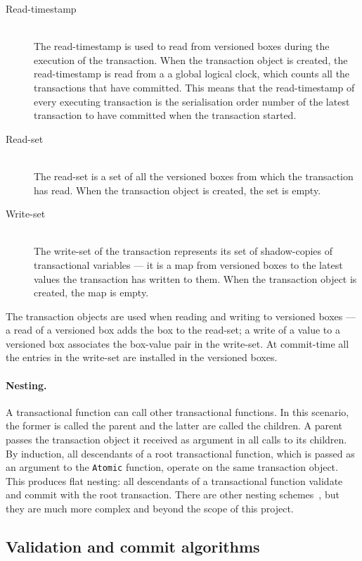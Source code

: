 \documentclass[12pt,a4paper,oneside,openright]{report}
\newcommand{\goFunc}[1]{\texttt{#1}}
\begin{document}
\begin{description}
\item[Read-timestamp] \hfill\\
  The read-timestamp is used to read from versioned boxes during the
  execution of the transaction. When the transaction object is
  created, the read-timestamp is read from a a global logical clock,
  which counts all the transactions that have committed. This means
  that the read-timestamp of every executing transaction is the
  serialisation order number of the latest transaction to have
  committed when the transaction started.
\item[Read-set] \hfill\\
  The read-set is a set of all the versioned boxes from which the
  transaction has read. When the transaction object is created, the
  set is empty.
\item[Write-set] \hfill\\
  The write-set of the transaction represents its set of shadow-copies
  of transactional variables --- it is a map from versioned boxes to
  the latest values the transaction has written to them. When the
  transaction object is created, the map is empty.
\end{description}
The transaction objects are used when reading and writing to versioned
boxes --- a read of a versioned box adds the box to the read-set; a
write of a value to a versioned box associates the box-value pair in
the write-set. At commit-time all the entries in the write-set are
installed in the versioned boxes.

\paragraph{Nesting.} A transactional function can call other
transactional functions. In this scenario, the former is called the
parent and the latter are called the children. A parent passes the
transaction object it received as argument in all calls to its
children. By induction, all descendants of a root transactional
function, which is passed as an argument to the \goFunc{Atomic}
function, operate on the same transaction object. This produces flat
nesting: all descendants of a transactional function validate and
commit with the root transaction. There are other nesting
schemes~\cite{diegues2012review}, but they are much more complex and
beyond the scope of this project.

\subsection{Validation and commit algorithms}
\label{sec:valid-comm-algor}
\end{document}

